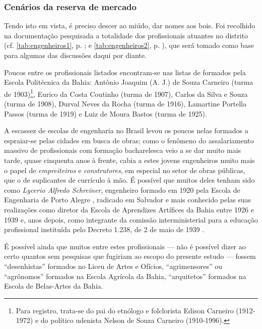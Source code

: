 \subsubsection{Cenários da reserva de mercado}\label{subsubsec:cenresermerc}

Tendo isto em vista, é preciso descer ao miúdo, dar nomes aos bois. Foi recolhido na documentação pesquisada a totalidade dos profissionais atuantes no distrito (cf. \autoref{tab:engenheiros1}, p. \pageref{tab:engenheiros1}; e \autoref{tab:engenheiros2}, p. \pageref{tab:engenheiros2}), que será tomado como base para algumas das discussões daqui por diante.

Poucos entre os profissionais listados encontram-se nas listas de formados pela Escola Politécnica da Bahia: Antônio Joaquim (A. J.) de Souza Carneiro (turma de 1903)\footnote{Para registro, trata-se do pai do etnólogo e folclorista Edison Carneiro (1912-1972) e do político udenista Nelson de Souza Carneiro (1910-1996).}, Eurico da Costa Coutinho (turma de 1907), Carlos da Silva e Souza (turma de 1908), Durval Neves da Rocha (turma de 1916), Lamartine Portella Passos (turma de 1919) e Luiz de Moura Bastos (turma de 1925). 

A escassez de escolas de engenharia no Brasil levou os poucos nelas formados a espraiar-se pelas cidades em busca de obras; como o fenômeno do assalariamento massivo de profissionais com formação bacharelesca veio a se dar muito mais tarde, quase cinquenta anos à frente, cabia a estes jovens engenheiros muito mais o papel de \textit{empreiteiros} e \textit{construtores}, em especial no setor de obras públicas, que o de suplicantes de currículo à mão. É possível que muitos deles tenham sido como \textit{Lycerio Alfredo Schreiner}, engenheiro formado em 1920 pela Escola de Engenharia de Porto Alegre \cite{lersch_engenhariapoa_2014}, radicado em Salvador e mais conhecido pelas suas realizações como diretor da Escola de Aprendizes Artífices da Bahia entre 1926 e 1939 \cite{moreira_escolaartifices_2009} e, anos depois, como integrante da comissão interministerial para a educação profissional instituída pelo Decreto 1.238, de 2 de maio de 1939 \cite[p.~184]{almeida_ensinoindustrial_2010}. 

É possível ainda que muitos entre estes profissionais --- não é possível dizer ao certo quantos sem pesquisas que fugiriam ao escopo do presente estudo --- fossem ``desenhistas'' formados no Liceu de Artes e Ofícios, ``agrimensores'' ou  ``agrônomos'' formados na Escola Agrícola da Bahia, ``arquitetos'' formados na Escola de Belas-Artes da Bahia. 

